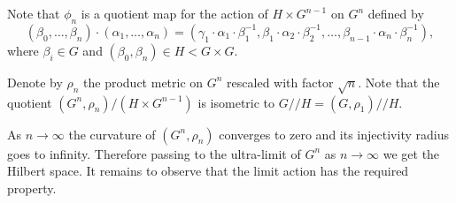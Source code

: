 Note that $\phi_n$ is a quotient map for the action of $H\times G^{n-1}$ on $G^n$ defined by
\[(\beta_0,\dots,\beta_n)\cdot(\alpha_1,\dots,\alpha_n)=(\gamma_1\cdot \alpha_1\cdot\beta_1^{-1},\beta_1\cdot\alpha_2\cdot\beta_2^{-1},\dots,\beta_{n-1}\cdot\alpha_n\cdot\beta_n^{-1}),\]
where $\beta_i\in G$ and $(\beta_0,\beta_n)\in H<G\times G$. 

Denote by $\rho_n$ the product metric on $G^n$ rescaled with factor $\sqrt{n}$.
Note that the quotient $(G^n,\rho_n)/(H\times G^{n-1})$ is isometric to $G/\!\!/H=(G,\rho_1)/\!\!/H$.

As $n\to\infty$ the curvature of $(G^n,\rho_n)$ converges to zero and its injectivity radius goes to infinity.
Therefore passing to the ultra-limit of $G^n$ as $n\to\infty$ we get the Hilbert space.
It remains to observe that the limit action has the required property.
\qeds
